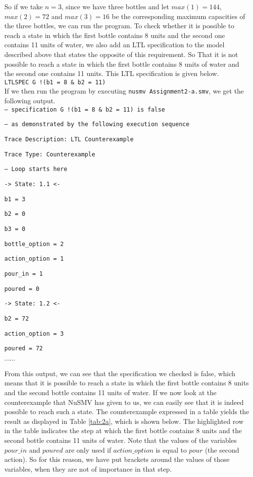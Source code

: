 \documentclass[a4paper]{article}
\begin{document}
	So if we take $n=3$, since we have three bottles and let $max(1)=144$, $max(2)=72$ and $max(3)=16$ be the corresponding maximum capacities of the three bottles, we can run the program. To check whether it is possible to reach a state in which the first bottle contains 8 units and the second one contains 11 units of water, we also add an LTL specification to the model described above that states the opposite of this requirement. So That it is not possible to reach a state in which the first bottle contains 8 units of water and the second one contains 11 units. This LTL specification is given below.\\

{\tt LTLSPEC G !(b1 = 8 \& b2 = 11) }\\

If we then run the program by executing {\tt nusmv Assignment2-a.smv}, we get the following output.\\

{\tt -- specification  G !(b1 = 8 \& b2 = 11)  is false }

{\tt -- as demonstrated by the following execution sequence }

{\tt Trace Description: LTL Counterexample }

{\tt Trace Type: Counterexample }

{\tt   -- Loop starts here }

{\tt   -> State: 1.1 <- }

{\tt     b1 = 3 }

{\tt     b2 = 0 }

{\tt     b3 = 0 }

{\tt     bottle\_option = 2 }

{\tt     action\_option = 1 }

{\tt     pour\_in = 1 }

{\tt     poured = 0 }

{\tt   -> State: 1.2 <- }

{\tt     b2 = 72 }

{\tt     action\_option = 3 }

{\tt     poured = 72 }

$\cdots \cdots$

From this output, we can see that the specification we checked is false, which means that it is possible to reach a state in which the first bottle contains 8 units and the second bottle contains 11 units of water. If we now look at the counterexample that NuSMV has given to us, we can easily see that it is indeed possible to reach such a state. The counterexample expressed in a table yields the result as displayed in Table \ref{tab:2a}, which is shown below. The highlighted row in the table indicates the step at which the first bottle contains 8 units and the second bottle contains 11 units of water. Note that the values of the variables $pour\_in$ and $poured$ are only used if $action\_option$ is equal to $pour$ (the second action). So for this reason, we have put brackets around the values of those variables, when they are not of importance in that step.
\end{document}

